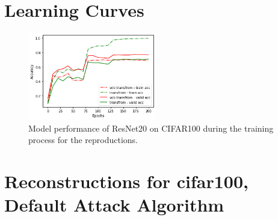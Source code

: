 \newpage
\appendix

\section{Learning Curves}
\begin{figure}[hbt!]
\includegraphics[width=0.5\textwidth]{pics/accuracy_vs_epochs.png}
\caption{Model performance of ResNet20 on CIFAR100
during the training process for the reproductions.}%
\end{figure}


\section{Reconstructions for cifar100, Default Attack Algorithm}\label{apx:rdaa}

